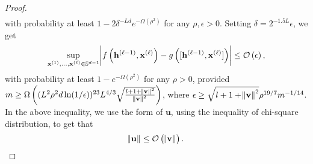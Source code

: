 \begin{proof}
\begin{align*}
	\end{align*}
	with probability at least $1 - 2\delta^{-Ld} e^{-\Omega(\rho^2)}$ for any $\rho, \epsilon > 0$.  Setting $\delta = 2^{-1.5L}\epsilon$, we get
	\begin{equation*}
		\sup_{\mathbf{x}^{(1)}, ..., \mathbf{x}^{(\ell)} \in \mathbb{S}^{d-1}} \abs{f\left(\mathbf{h}^{(\ell-1)}, \mathbf{x}^{(\ell)}\right) - g\left([\mathbf{h}^{(\ell-1)}, \mathbf{x}^{(\ell)}]\right)}  \le \mathcal{O}\left(\epsilon\right),
	\end{equation*}
	with probability at least $1 -  e^{-\Omega\left(\rho^2\right)}$ for any $\rho > 0$, provided $m \ge \Omega\left((L^2 \rho^2 d \ln (1/\epsilon))^{23} L^{4/3} \sqrt{\frac{l + 1 + \norm{\mathbf{v}}^2}{\norm{\mathbf{v}}^2}}\right)$, where $\epsilon \ge \sqrt{l + 1 + \norm{\mathbf{v}}^2} \rho^{19/7} m^{-1/14}$. In the above inequality, we use the form of $\mathbf{u}$, using the inequality of chi-square distribution, to get that
	\begin{equation*}
		\norm{\mathbf{u}} \le \mathcal{O}\left(\norm{\mathbf{v}}\right).
	\end{equation*}
	\fi
\end{proof}

